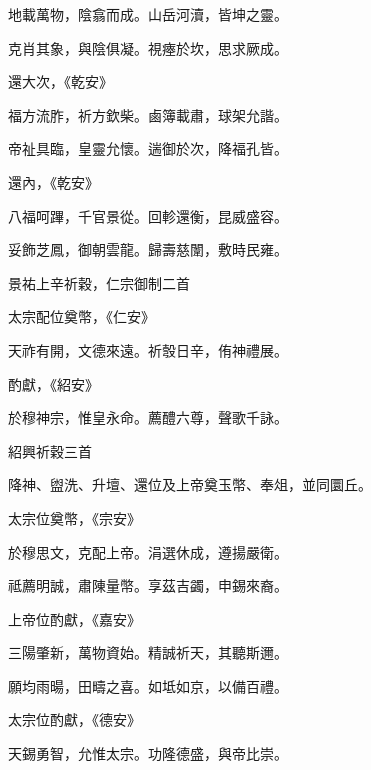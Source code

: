 \begin{pinyinscope}
 地載萬物，陰翕而成。山岳河瀆，皆坤之靈。



 克肖其象，與陰俱凝。視瘞於坎，思求厥成。



 還大次，《乾安》



 福方流胙，祈方欽柴。鹵簿載肅，球架允諧。



 帝祉具臨，皇靈允懷。遄御於次，降福孔皆。



 還內，《乾安》



 八福呵蹕，千官景從。回軫還衡，昆威盛容。



 妥飾芝鳳，御朝雲龍。歸壽慈闈，敷時民雍。



 景祐上辛祈穀，仁宗御制二首



 太宗配位奠幣，《仁安》



 天祚有開，文德來遠。祈彀日辛，侑神禮展。



 酌獻，《紹安》



 於穆神宗，惟皇永命。薦醴六尊，聲歌千詠。



 紹興祈穀三首



 降神、盥洗、升壇、還位及上帝奠玉幣、奉俎，並同圜丘。



 太宗位奠幣，《宗安》



 於穆思文，克配上帝。涓選休成，遵揚嚴衛。



 祗薦明誠，肅陳量幣。享茲吉蠲，申錫來裔。



 上帝位酌獻，《嘉安》



 三陽肇新，萬物資始。精誠祈天，其聽斯邇。



 願均雨暘，田疇之喜。如坻如京，以備百禮。



 太宗位酌獻，《德安》



 天錫勇智，允惟太宗。功隆德盛，與帝比崇。




\end{pinyinscope}
